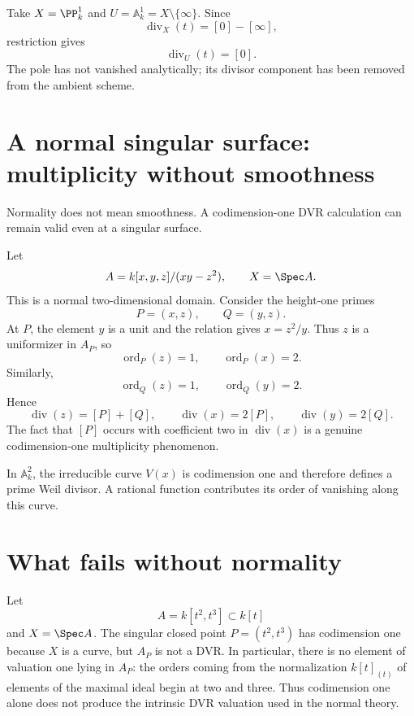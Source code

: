 \begin{example}\label{ex:vi39-remove-infinity}
Take \(X=\PP^1_k\) and \(U=\mathbb{A}^1_k=X\setminus\{\infty\}\).  Since
\[
 \operatorname{div}_X(t)=[0]-[\infty],
\]
restriction gives
\[
 \operatorname{div}_U(t)=[0].
\]
The pole has not vanished analytically; its divisor component has been removed from the ambient scheme.
\end{example}



\section{A normal singular surface: multiplicity without smoothness}
Normality does not mean smoothness.  A codimension-one DVR calculation can remain valid even at a singular surface.

\begin{example}[The quadric cone \(xy=z^2\)]\label{ex:vi39-a1-singularity}
Let
\[
 A=k[x,y,z]/(xy-z^2),\qquad X=\Spec A.
\]
This is a normal two-dimensional domain.  Consider the height-one primes
\[
 P=(x,z),\qquad Q=(y,z).
\]
At \(P\), the element \(y\) is a unit and the relation gives \(x=z^2/y\).  Thus \(z\) is a uniformizer in \(A_P\), so
\[
 \operatorname{ord}_P(z)=1,\qquad \operatorname{ord}_P(x)=2.
\]
Similarly,
\[
 \operatorname{ord}_Q(z)=1,\qquad \operatorname{ord}_Q(y)=2.
\]
Hence
\[
 \operatorname{div}(z)=[P]+[Q],\qquad
 \operatorname{div}(x)=2[P],\qquad
 \operatorname{div}(y)=2[Q].
\]
The fact that \([P]\) occurs with coefficient two in \(\operatorname{div}(x)\) is a genuine codimension-one multiplicity phenomenon.
\end{example}



\begin{example}\label{ex:vi39-expand-03}
In $\mathbb A^2_k$, the irreducible curve $V(x)$ is codimension one and therefore defines a prime Weil divisor.  A rational function contributes its order of vanishing along this curve.
\end{example}
\section{What fails without normality}
\begin{example}\label{ex:vi39-cusp-nonnormal}
Let
\[
 A=k[t^2,t^3]\subset k[t]
\]
and \(X=\Spec A\).  The singular closed point \(P=(t^2,t^3)\) has codimension one because \(X\) is a curve, but \(A_P\) is not a DVR.  In particular, there is no element of valuation one lying in \(A_P\): the orders coming from the normalization \(k[t]_{(t)}\) of elements of the maximal ideal begin at two and three.  Thus codimension one alone does not produce the intrinsic DVR valuation used in the normal theory.
\end{example}

